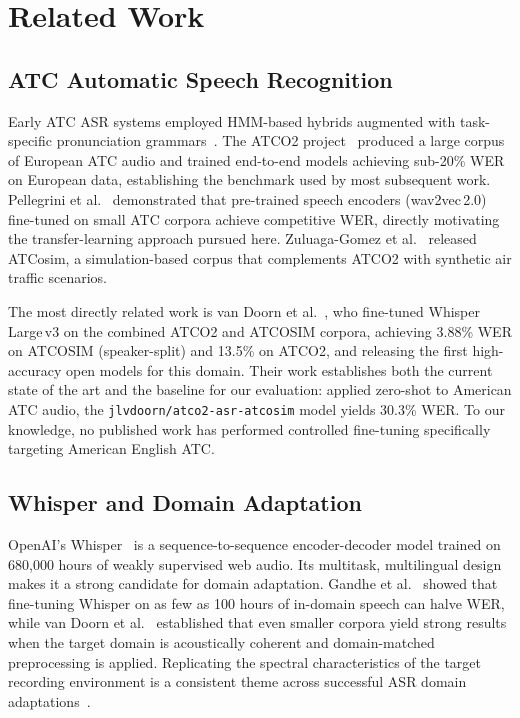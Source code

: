 \documentclass[11pt,a4paper]{article}
\begin{document}
\section{Related Work}
\label{sec:related}

\subsection{ATC Automatic Speech Recognition}

Early ATC ASR systems employed HMM-based hybrids augmented with task-specific
pronunciation grammars~\cite{cordero2012atcasr}. The ATCO2
project~\cite{kocour2021atco2} produced a large corpus of European ATC audio
and trained end-to-end models achieving sub-20\% WER on European data,
establishing the benchmark used by most subsequent work.
Pellegrini et al.~\cite{pellegrini2021atc} demonstrated that pre-trained
speech encoders (wav2vec\,2.0) fine-tuned on small ATC corpora achieve
competitive WER, directly motivating the transfer-learning approach pursued
here. Zuluaga-Gomez et al.~\cite{zuluagagomez2022atcosim} released ATCosim,
a simulation-based corpus that complements ATCO2 with synthetic air traffic
scenarios.

The most directly related work is van Doorn et
al.~\cite{vandoorn2024whisperatc}, who fine-tuned Whisper Large\,v3 on the
combined ATCO2 and ATCOSIM corpora, achieving 3.88\% WER on ATCOSIM
(speaker-split) and 13.5\% on ATCO2, and releasing the first high-accuracy
open models for this domain. Their work
establishes both the current state of the art and the baseline for our
evaluation: applied zero-shot to American ATC audio, the
\texttt{jlvdoorn/atco2-asr-atcosim} model yields 30.3\% WER. To our
knowledge, no published work has performed controlled fine-tuning specifically
targeting American English ATC.

\subsection{Whisper and Domain Adaptation}

OpenAI's Whisper~\cite{radford2023whisper} is a sequence-to-sequence
encoder-decoder model trained on 680,000 hours of weakly supervised web audio.
Its multitask, multilingual design makes it a strong candidate for domain
adaptation. Gandhe et al.~\cite{gandhe2023whisperadapt} showed that fine-tuning
Whisper on as few as 100 hours of in-domain speech can halve WER, while van
Doorn et al.~\cite{vandoorn2024whisperatc} established that even smaller
corpora yield strong results when the target domain is acoustically coherent
and domain-matched preprocessing is applied. Replicating the spectral
characteristics of the target recording environment is a consistent theme
across successful ASR domain adaptations~\cite{park2019specaugment}.
\end{document}
